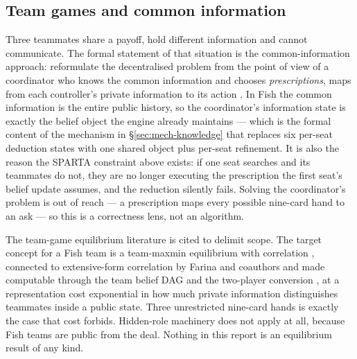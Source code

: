 \subsection{Team games and common information}
\label{sec:related-team}

Three teammates share a payoff, hold different information and cannot
communicate. The formal statement of that situation is the common-information
approach: reformulate the decentralised problem from the point of view of a
coordinator who knows the common information and chooses \emph{prescriptions},
maps from each controller's private information to its action
\cite{nayyar2013common}. In Fish the common information is the entire public
history, so the coordinator's information state is exactly the belief object the
engine already maintains --- which is the formal content of the mechanism in
\S\ref{sec:mech-knowledge} that replaces six per-seat deduction states with one
shared object plus per-seat refinement. It is also the reason the SPARTA
constraint above exists: if one seat searches and its teammates do not, they are
no longer executing the prescription the first seat's belief update assumes, and
the reduction silently fails. Solving the coordinator's problem is out of reach
--- a prescription maps every possible nine-card hand to an ask --- so this is a
correctness lens, not an algorithm.

The team-game equilibrium literature is cited to delimit scope. The target
concept for a Fish team is a team-maxmin equilibrium with correlation
\cite{celli-gatti}, connected to extensive-form correlation by Farina and
coauthors \cite{farina-collusion} and made computable through the team belief
DAG and the two-player conversion \cite{zhang-tbdag,carminati-tpi}, at a
representation cost exponential in how much private information distinguishes
teammates inside a public state. Three unrestricted nine-card hands is exactly
the case that cost forbids. Hidden-role machinery \cite{carminati2024hiddenrole}
does not apply at all, because Fish teams are public from the deal. Nothing in
this report is an equilibrium result of any kind.

